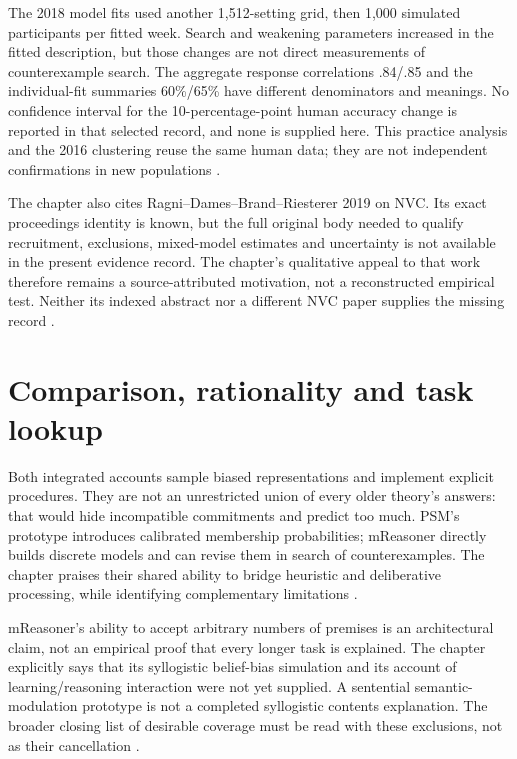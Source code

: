 The 2018 model fits used another 1,512-setting grid, then 1,000 simulated
participants per fitted week. Search and weakening parameters increased
in the fitted description, but those changes are not direct measurements
of counterexample search. The aggregate response correlations .84/.85
and the individual-fit summaries 60\%/65\% have different denominators
and meanings. No confidence interval for the 10-percentage-point human
accuracy change is reported in that selected record, and none is supplied
here. This practice analysis and the 2016 clustering reuse the same human
data; they are not independent confirmations in new populations
\cite[pp.~3--5]{RagniEtAl2018LogicalWithoutFeedback}.

The chapter also cites Ragni--Dames--Brand--Riesterer 2019 on NVC. Its
exact proceedings identity is known, but the full original body needed
to qualify recruitment, exclusions, mixed-model estimates and uncertainty
is not available in the present evidence record. The chapter's qualitative
appeal to that work therefore remains a source-attributed motivation,
not a reconstructed empirical test. Neither its indexed abstract nor a
different NVC paper supplies the missing record
\cite[p.~228,230,236]{Khemlani2021Syllogistic}
\cite{RagniEtAl2019NothingFollows}.

\section{Comparison, rationality and task lookup}
\label{sec:p19-r33-lookup}

Both integrated accounts sample biased representations and implement
explicit procedures. They are not an unrestricted union of every older
theory's answers: that would hide incompatible commitments and predict
too much. PSM's prototype introduces calibrated membership probabilities;
mReasoner directly builds discrete models and can revise them in search
of counterexamples. The chapter praises their shared ability to bridge
heuristic and deliberative processing, while identifying complementary
limitations \cite[pp.~233--234]{Khemlani2021Syllogistic}.

mReasoner's ability to accept arbitrary numbers of premises is an
architectural claim, not an empirical proof that every longer task is
explained. The chapter explicitly says that its syllogistic belief-bias
simulation and its account of learning/reasoning interaction were not yet
supplied. A sentential semantic-modulation prototype is not a completed
syllogistic contents explanation. The broader closing list of desirable
coverage must be read with these exclusions, not as their cancellation
\cite[pp.~232--234]{Khemlani2021Syllogistic}.

